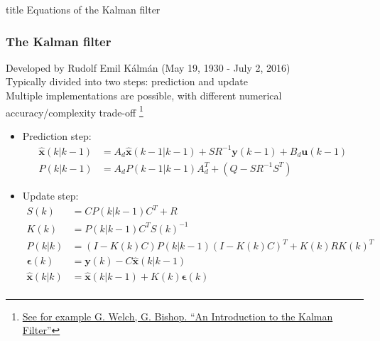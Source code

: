 \begin{frame}
	\vfill
	\centering
	\begin{beamercolorbox}[sep=8pt,center,shadow=true,rounded=true]{title}
		Equations of the Kalman filter\par%
	\end{beamercolorbox}
	\vfill
\end{frame}

\begin{frame}
	\frametitle{The Kalman filter}
	Developed by Rudolf Emil Kálmán (May 19, 1930 - July 2, 2016)\\
	Typically divided into two steps: prediction and update\\
	Multiple implementations are possible, with different numerical accuracy/complexity trade-off \footnote{\href{http://www.cs.unc.edu/~tracker/media/pdf/SIGGRAPH2001_CoursePack_08.pdf}{See for example G. Welch, G. Bishop. ``An Introduction to the Kalman Filter''}}
	\begin{itemize}
		\item Prediction step: 
		\begin{align*}
		\hat{\bm{x}}(k|k-1)&=A_d \hat{\bm{x}}(k-1|k-1)+SR^{-1}\bm{y}(k-1)+B_d \bm{u}(k-1)\\
		P(k|k-1)&=A_dP(k-1|k-1)A_d^T+(Q-SR^{-1}S^T)
		\end{align*} 
		\item Update step:
		\begin{align*}
		S(k)&=CP(k|k-1)C^T+R\\
		K(k)&=P(k|k-1)C^TS(k)^{-1}\\
		P(k|k)&=(I-K(k)C)P(k|k-1)(I-K(k)C)^T+K(k)RK(k)^T\\
		\bm{\epsilon}(k)& = \bm{y}(k) - C\hat{\bm{x}}(k|k-1)\\
		\hat{\bm{x}}(k|k)&=\hat{\bm{x}}(k|k-1)+K(k)\bm{\epsilon}(k)\\
		\end{align*} 	
	\end{itemize}
\end{frame}
